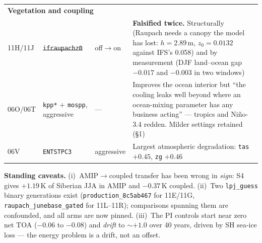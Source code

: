 \documentclass[9pt,a4paper]{article}
\newcommand{\pk}{\textcolor{black!55}}
\begin{document}
\begin{center}
\begin{longtable}{p{} p{} p{} p{}}
\multicolumn{4}{l}{\textbf{Vegetation and coupling}}\\
11H/11J & \sout{\texttt{ifraupachz0}} & off$\to$on & \textbf{Falsified twice.} Structurally (Raupach needs a canopy the model has lost: $h=2.89$\,m, $z_0=0.0132$ against IFS's 0.058) and by measurement (DJF land--ocean gap $-0.017$ and $-0.003$ in two windows) \\
06O/06T & \pk{\texttt{kpp*} $+$ \texttt{mospp}, aggressive} & --- & \pk{Improves the ocean interior but ``the cooling leaks well beyond where an ocean-mixing parameter has any business acting'' --- tropics and Ni\~no-3.4 redden. Milder settings retained (\S1)} \\
06V & \texttt{ENTSTPC3} & aggressive & Largest atmospheric degradation: \texttt{tas} $+0.45$, \texttt{zg} $+0.46$ \\
\bottomrule
\end{longtable}
\end{center}

\vspace{2mm}\footnotesize
\textbf{Standing caveats.} (i)~AMIP$\to$coupled transfer has been wrong in \emph{sign}: S4 gives
$+1.19$\,K of Siberian JJA in AMIP and $-0.37$\,K coupled. (ii)~Two \texttt{lpj\_guess} binary
generations exist (\texttt{production\_8c5ab467} for 11E/11G, \texttt{raupach\_junebase\_gated}
for 11L--11R); comparisons spanning them are confounded, and all arms are now pinned.
(iii)~The PI controls start near zero net TOA ($-0.06$ to $-0.08$) and \emph{drift} to ${\sim}+1.0$
over 40 years, driven by SH sea-ice loss --- the energy problem is a drift, not an offset.
\end{document}
